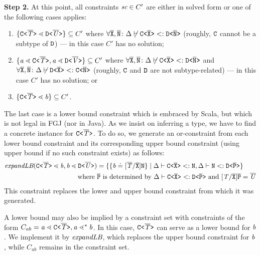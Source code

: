 \textbf{Step 2.} At this point, all
constraints $ \textit{sc} \in C'$ are either in solved form or one of the following
cases applies:
\begin{enumerate}
\item $\{ \mathtt{C \texttt{<} \overline{\mathit{T}} \texttt{>} } \lessdot \mathtt{D \texttt{<} \overline{\mathit{U}} \texttt{>} } \}
  \subseteq C'$ where $\forall\overline{\tt X},\overline{\tt N}\colon \Delta \not\vdash \mathtt{C \texttt{<} \overline{\tt X} \texttt{>} } <:
  \mathtt{D \texttt{<} \overline{\tt N} \texttt{>} }$ (roughly, ${\tt C}$ cannot be a subtype of ${\tt D}$) --- in this case $C'$ has no solution;
\item $\{ \mathit{ a } \lessdot \mathtt{C \texttt{<} \overline{\mathit{T}} \texttt{>} }, \mathit{ a } \lessdot
    \mathtt{D \texttt{<} \overline{\mathit{V}} \texttt{>} } \} \subseteq C'$ where
  $\forall\overline{\tt X},\overline{\tt N}\colon \Delta \not\vdash \mathtt{C \texttt{<} \overline{\tt X} \texttt{>} } <:
  \mathtt{D \texttt{<} \overline{\tt N} \texttt{>} } $ and $\forall\overline{\tt X},\overline{\tt N}\colon \Delta \not\vdash \mathtt{D \texttt{<} \overline{\tt X} \texttt{>} } <:
  \mathtt{C \texttt{<} \overline{\tt N} \texttt{>} }$ (roughly, ${\tt C}$ and ${\tt D}$ are not
  subtype-related) --- in this case $C'$ has no solution; or
\item $\{ \mathtt{C \texttt{<} \overline{\mathit{T}} \texttt{>} } \lessdot \mathit{ b } \} \subseteq C'$.
\end{enumerate}
The last case is a lower bound constraint which is embraced by Scala,
but which is not legal in FGJ (nor in Java). As we insist on inferring
a type, we have to find a concrete instance for
$\mathtt{C \texttt{<} \overline{\mathit{T}} \texttt{>} }$. To do so, we generate an or-constraint from
each lower bound constraint and its corresponding upper bound constraint (using upper bound  if no such constraint exists) as follows:
\begin{align*}
  \textit{expandLB} (\mathtt{C \texttt{<} \overline{\mathit{T}} \texttt{>} } \lessdot \mathit{ b }, \mathit{ b } \lessdot \mathtt{D \texttt{<} \overline{\mathit{U}} \texttt{>} })
  & = \{  \{  \mathit{ b } \doteq [\overline{\mathit{T}}/\overline{\tt X}]\texttt{N}  \} \mid
    \Delta \vdash \mathtt{C \texttt{<} \overline{\texttt{X}} \texttt{>} } <: \texttt{N},
    \Delta \vdash \texttt{N} <:  \mathtt{D \texttt{<} \overline{P} \texttt{>} } \}
  \\ \text{where }&\overline{\tt P}\text{ is determined by }\Delta \vdash \mathtt{C \texttt{<} \overline{\texttt{X}} \texttt{>} } <: \mathtt{D \texttt{<} \overline{\tt P} \texttt{>} } \text{ and
  } [\mathit{T}/\overline{\tt X}]\overline{\tt P} = \overline{\mathit{U}}
\end{align*}
This constraint replaces the lower and upper bound constraint from which it was generated.

A lower bound may also be implied by a constraint set with constraints of the form
$C_{ab} = \mathit{ a } \lessdot \mathtt{C \texttt{<} \overline{\mathit{T}} \texttt{>} }, \mathit{ a } \lessdot^* \mathit{ b }$. In this case, $\mathtt{C \texttt{<} \overline{\mathit{T}} \texttt{>} } $ can serve as a lower bound for
$\mathit{ b }$. We implement it by $\textit{expandLB}$, which replaces the upper bound constraint for $\mathit{ b }$, while $C_{ab}$ remains in the constraint
set.

